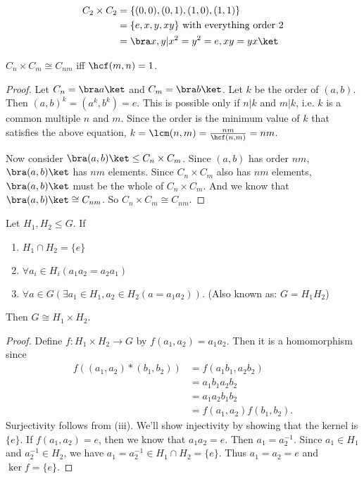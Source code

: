 \documentclass[a4pape]{article}
\begin{document}
\begin{eg}
  \begin{align*}
    C_2\times C_2 &= \{(0, 0), (0, 1), (1, 0), (1, 1)\}\\
    &= \{e, x, y, xy\} \text{ with everything order 2}\\
    &= \bra x, y|x^2=y^2=e, xy = yx\ket
  \end{align*}
\end{eg}

\begin{prop}
  $C_n\times C_m\cong C_{nm}$ iff $\hcf(m, n) = 1$.
\end{prop}

\begin{proof}
  Let $C_n = \bra a\ket$ and $C_m = \bra b \ket$. Let $k$ be the order of $(a, b)$. Then $(a, b)^k = (a^k, b^k) = e$. This is possible only if $n | k$ and $m | k$, i.e. $k$ is a common multiple $n$ and $m$. Since the order is the minimum value of $k$ that satisfies the above equation, $k = \lcm(n, m) = \frac{nm}{\hcf(n, m)} = nm$.

  Now consider $\bra (a, b)\ket \leq C_n\times C_m$. Since $(a, b)$ has order $nm$, $\bra (a, b)\ket$ has $nm$ elements. Since $C_n\times C_m$ also has $nm$ elements, $\bra (a, b)\ket$ must be the whole of $C_n\times C_m$. And we know that $\bra (a, b)\ket\cong C_{nm}$. So $C_n\times C_m \cong C_{nm}$.
\end{proof}

\begin{prop}
  Let $H_1, H_2\leq G$. If
  \begin{enumerate}
   \item $H_1\cap H_2 = \{e\}$
   \item $\forall a_i\in H_i(a_1a_2=a_2a_1)$
   \item $\forall a\in G(\exists a_1\in H_1, a_2\in H_2(a = a_1a_2))$. (Also known as: $G=H_1H_2$)
  \end{enumerate}
  Then $G\cong H_1\times H_2$.
\end{prop}

\begin{proof}
  Define $f:H_1\times H_2\rightarrow G$ by $f(a_1, a_2) = a_1a_2$. Then it is a homomorphism since
  \begin{align*}
    f((a_1, a_2)*(b_1,b_2)) &= f(a_1b_1, a_2b_2)\\
    &= a_1b_1a_2b_2\\
    &= a_1a_2b_1b_2\\
    &= f(a_1, a_2)f(b_1,b_2).
  \end{align*}
Surjectivity follows from (iii). We'll show injectivity by showing that the kernel is $\{e\}$. If $f(a_1, a_2)=e$, then we know that $a_1a_2 = e$. Then $a_1=a_2^{-1}$. Since $a_1 \in H_1$ and $a_2^{-1} \in H_2$, we have $a_1 = a_2^{-1} \in H_1\cap H_2 = \{e\}$. Thus $a_1 = a_2 = e$ and $\ker f = \{e\}$.
\end{proof}
\end{document}
